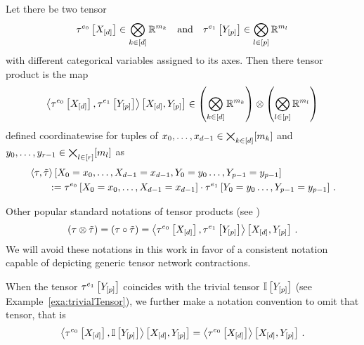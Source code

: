 \begin{definition}\label{def:tensorProduct}
	Let there be two tensor
	\begin{align*}
		\tau^{e_0}\left[X_{[d]}\right] \in \bigotimes_{k\in[d]} \mathbb{R}^{m_{k}}  \quad\text{and}\quad \tau^{e_1}\left[Y_{[p]}\right] \in \bigotimes_{l\in[p]} \mathbb{R}^{m_{l}}
	\end{align*}
	with different categorical variables assigned to its axes.
	Then there tensor product is the map
	\begin{align*}
		\left\langle \tau^{e_0}\left[X_{[d]}\right],\tau^{e_1}\left[Y_{[p]}\right]\right\rangle \left[ X_{[d]},Y_{[p]} \right]
		\in \left(\bigotimes_{k\in[d]} \mathbb{R}^{m_{k}}\right) \otimes \left(\bigotimes_{l\in[p]} \mathbb{R}^{m_{l}} \right)
	\end{align*}
	defined coordinatewise for tuples of $x_{0},\ldots,x_{d-1}\in\bigtimes_{k\in[d]}[m_{k}]$ and ${y_{0},\ldots,y_{r-1}}\in\bigtimes_{l\in[r]}[m_{l}]$ as
	\begin{align*}
		& \left\langle \tau,\tilde{\tau}\right\rangle \left[ X_{0}=x_{0},\ldots,X_{d-1}=x_{d-1},Y_{0}=y_{0}\ldots,Y_{p-1}=y_{p-1} \right] \\
		&\quad\quad :=  \tau^{e_0}\left[X_{0}=x_{0},\ldots,X_{d-1}=x_{d-1}\right]\cdot \tau^{e_1}\left[Y_{0}=y_{0}\ldots,Y_{p-1}=y_{p-1}\right] \, .
	\end{align*}
\end{definition}

Other popular standard notations of tensor products (see \cite{kolda_tensor_2009,hackbusch_tensor_2012,cichocki_tensor_2015})
	\[ \left(\tau \otimes \tilde{\tau}\right) = \left(\tau \circ \tilde{\tau}\right)
	= \left\langle \tau^{e_0}\left[X_{[d]}\right],\tau^{e_1}\left[Y_{[p]}\right]\right\rangle \left[ X_{[d]},Y_{[p]} \right]  \, . \]
We will avoid these notations in this work in favor of a consistent notation capable of depicting generic tensor network contractions.

When the tensor $\tau^{e_1}\left[Y_{[p]}\right]$ coincides with the trivial tensor $\mathbb{I}\left[Y_{[p]}\right]$ (see Example~\ref{exa:trivialTensor}), we further make a notation convention to omit that tensor, that is
\begin{align*}
	\left\langle \tau^{e_0}\left[X_{[d]}\right],\mathbb{I}\left[Y_{[p]}\right]\right\rangle \left[ X_{[d]},Y_{[p]} \right]
	= \left\langle \tau^{e_0}\left[X_{[d]}\right]\right\rangle \left[ X_{[d]},Y_{[p]} \right] \, .
\end{align*}


